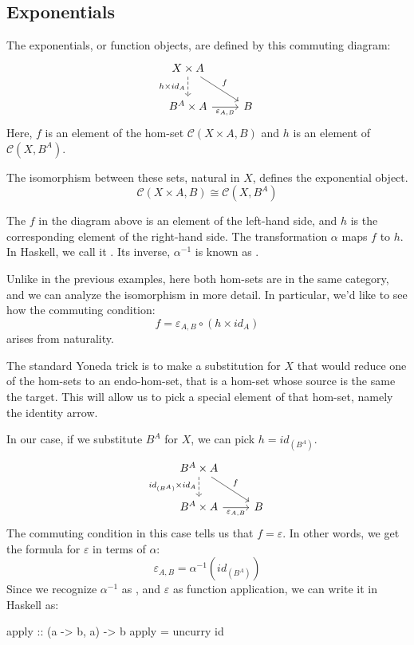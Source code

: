\documentclass[DaoFP]{subfiles}
\begin{document}
\subsection{Exponentials}

The exponentials, or function objects, are defined by this commuting diagram:
\[
 \begin{tikzcd}
 X \times A
 \arrow[d, dashed, "h \times id_A"']
 \arrow[rd, "f"]
 \\
 B^A \times A
 \arrow[r, "\varepsilon_{A, B}"']
& B
 \end{tikzcd}
\]
Here, $f$ is an element of the hom-set $\mathcal{C}(X \times A, B)$ and $h$ is an element of $\mathcal{C}(X, B^A)$. 

The isomorphism between these sets, natural in $X$, defines the exponential object. 
\[\mathcal{C}(X \times A, B) \cong \mathcal{C}(X, B^A)\]

The $f$ in the diagram above is an element of the left-hand side, and $h$ is the corresponding element of the right-hand side. The transformation $\alpha$ maps $f$ to $h$. In Haskell, we call it . Its inverse, $\alpha^{-1}$ is known as .

Unlike in the previous examples, here both hom-sets are in the same category, and we can analyze the isomorphism in more detail. In particular, we'd like to see how the commuting condition:
\[  f = \varepsilon_{A, B} \circ (h \times id_A) \]
arises from naturality.

The standard Yoneda trick is to make a substitution for $X$ that would reduce one of the hom-sets to an endo-hom-set, that is a hom-set whose source is the same the target. This will allow us to pick a special element of that hom-set, namely the identity arrow.

In our case, if we substitute $B^A$ for $X$, we can pick $h = id_{(B^A)}$.
\[
 \begin{tikzcd}
 B^A \times A
 \arrow[d, dashed, "id_{(B^A)} \times id_A"']
 \arrow[rd, "f"]
 \\
 B^A \times A
 \arrow[r, "\varepsilon_{A, B}"']
& B
 \end{tikzcd}
\]
The commuting condition in this case tells us that $f = \varepsilon$. In other words, we get the formula for $\varepsilon$ in terms of $\alpha$:
\[ \varepsilon_{A, B} = \alpha^{-1} (id_{(B^A)}) \]
Since we recognize $\alpha^{-1}$ as , and $\varepsilon$ as function application, we can write it in Haskell as:
\begin{haskell}
apply :: (a -> b, a) -> b
apply = uncurry id
\end{haskell}
\end{document}
